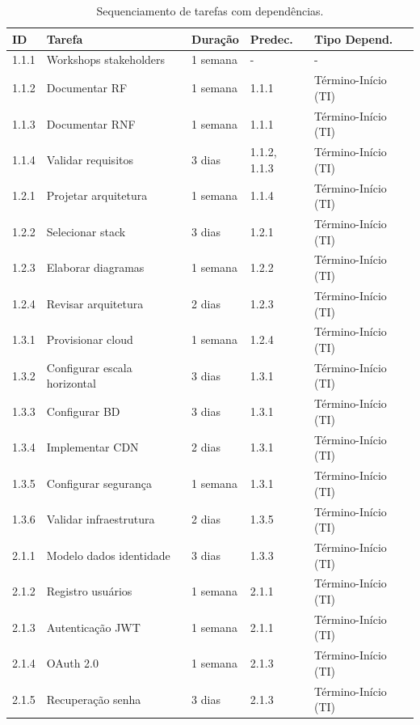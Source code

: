 \begin{table}[H]
\centering
\caption{Sequenciamento de tarefas com dependências.}%
\label{tab:sequenciamento}
\footnotesize
\begin{tabular}{|p{1cm}|p{5cm}|p{2cm}|p{1.5cm}|p{3cm}|}
\hline
\textbf{ID} & \textbf{Tarefa} & \textbf{Duração} & \textbf{Predec.} & \textbf{Tipo Depend.} \\ \hline
1.1.1 & Workshops stakeholders & 1 semana & - & - \\ \hline
1.1.2 & Documentar RF & 1 semana & 1.1.1 & Término-Início (TI) \\ \hline
1.1.3 & Documentar RNF & 1 semana & 1.1.1 & Término-Início (TI) \\ \hline
1.1.4 & Validar requisitos & 3 dias & 1.1.2, 1.1.3 & Término-Início (TI) \\ \hline
1.2.1 & Projetar arquitetura & 1 semana & 1.1.4 & Término-Início (TI) \\ \hline
1.2.2 & Selecionar stack & 3 dias & 1.2.1 & Término-Início (TI) \\ \hline
1.2.3 & Elaborar diagramas & 1 semana & 1.2.2 & Término-Início (TI) \\ \hline
1.2.4 & Revisar arquitetura & 2 dias & 1.2.3 & Término-Início (TI) \\ \hline
1.3.1 & Provisionar cloud & 1 semana & 1.2.4 & Término-Início (TI) \\ \hline
1.3.2 & Configurar escala horizontal & 3 dias & 1.3.1 & Término-Início (TI) \\ \hline
1.3.3 & Configurar BD & 3 dias & 1.3.1 & Término-Início (TI) \\ \hline
1.3.4 & Implementar CDN & 2 dias & 1.3.1 & Término-Início (TI) \\ \hline
1.3.5 & Configurar segurança & 1 semana & 1.3.1 & Término-Início (TI) \\ \hline
1.3.6 & Validar infraestrutura & 2 dias & 1.3.5 & Término-Início (TI) \\ \hline
2.1.1 & Modelo dados identidade & 3 dias & 1.3.3 & Término-Início (TI) \\ \hline
2.1.2 & Registro usuários & 1 semana & 2.1.1 & Término-Início (TI) \\ \hline
2.1.3 & Autenticação JWT & 1 semana & 2.1.1 & Término-Início (TI) \\ \hline
2.1.4 & OAuth 2.0 & 1 semana & 2.1.3 & Término-Início (TI) \\ \hline
2.1.5 & Recuperação senha & 3 dias & 2.1.3 & Término-Início (TI) \\ \hline

\end{tabular}
\end{table}

